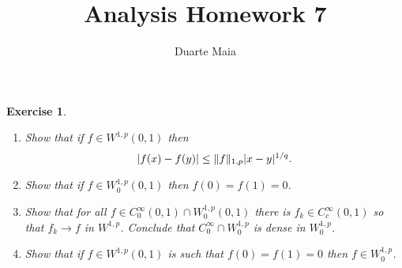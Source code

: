 \documentclass{article}
\title{Analysis Homework 7}
\author{Duarte Maia}
\newtheorem{ex}{Exercise}
\theoremstyle{nonumberplain}
\DeclarePairedDelimiter{\abs}{\lvert}{\rvert}
\DeclarePairedDelimiter{\Norm}{\lVert}{\rVert}
\begin{document}
\maketitle

\begin{ex}
\leavevmode
\begin{enumerate}
\item Show that if $f \in W^{1,p}(0,1)$ then
\begin{equation}
\abs{f(x) - f(y)} \leq \Norm{f}_{1,p} \abs{x-y}^{1/q}.
\end{equation}
\item Show that if $f \in W^{1,p}_0(0,1)$ then $f(0) = f(1) = 0$.
\item Show that for all $f \in C^\infty_0(0,1) \cap W^{1,p}_0(0,1)$ there is $f_k \in C^\infty_c(0,1)$ so that $f_k \to f$ in $W^{1,p}$. Conclude that $C^\infty_0 \cap W^{1,p}_0$ is dense in $W^{1,p}_0$.
\item Show that if $f \in W^{1,p}(0,1)$ is such that $f(0) = f(1) = 0$ then $f \in W^{1,p}_0$.
\end{enumerate}
\end{ex}
\end{document}
